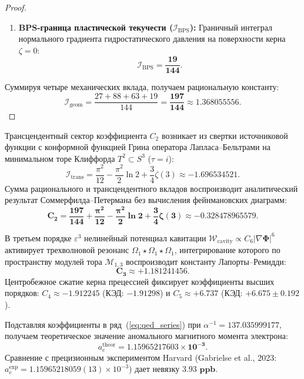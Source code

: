 \documentclass[11pt,a4paper]{article}
\theoremstyle{definition}
\theoremstyle{remark}
\begin{document}
\begin{proof}
\begin{enumerate}
    \item \textbf{BPS-граница пластической текучести ($\mathcal{I}_{\mathrm{BPS}}$):} Граничный интеграл нормального градиента гидростатического давления на поверхности керна $\zeta=0$:
    \begin{equation}
        \mathcal{I}_{\mathrm{BPS}} = \boldsymbol{\frac{19}{144}}.
    \end{equation}
\end{enumerate}
Суммируя четыре механических вклада, получаем рациональную константу:
\begin{equation}
    \mathcal{I}_{\mathrm{geom}} = \frac{27 + 88 + 63 + 19}{144} = \boldsymbol{\frac{197}{144}} \approx 1.368055556.
\end{equation}
\end{proof}

Трансцендентный сектор коэффициента $C_2$ возникает из свертки источниковой функции с конформной функцией Грина оператора Лапласа--Бельтрами на минимальном торе Клиффорда $T^2 \subset S^3$ ($\tau = i$):
\begin{equation}
    \mathcal{I}_{\mathrm{trans}} = \frac{\pi^2}{12} - \frac{\pi^2}{2}\ln 2 + \frac{3}{4}\zeta(3) \approx -1.696534521.
\end{equation}
Сумма рационального и трансцендентного вкладов воспроизводит аналитический результат Соммерфилда--Петермана без вычисления фейнмановских диаграмм:
\begin{equation}
    \mathbf{C_2 = \frac{197}{144} + \frac{\pi^2}{12} - \frac{\pi^2}{2}\ln 2 + \frac{3}{4}\zeta(3) \approx -0.328478965579}.
    \label{eq:c2_analytic_exact}
\end{equation}

В третьем порядке $\varepsilon^3$ нелинейный потенциал кавитации $\mathcal{W}_{\mathrm{cavity}} \propto C_6 |\nabla\boldsymbol{\Phi}|^6$ активирует трехволновой резонанс $\Omega_1 \star \Omega_1 \star \Omega_1$, интегрирование которого по пространству модулей тора $\mathcal{M}_{1,3}$ воспроизводит константу Лапорты--Ремидди:
\begin{equation}
    \mathbf{C_3 \approx +1.181241456}.
\end{equation}
Центробежное сжатие керна прецессией фиксирует коэффициенты высших порядков: $C_4 \approx -1.912245$ (КЭД: $-1.91298$) и $C_5 \approx +6.737$ (КЭД: $+6.675 \pm 0.192$).

Подставляя коэффициенты в ряд~(\ref{eq:qed_series}) при $\alpha^{-1} = 137.035999177$, получаем теоретическое значение аномального магнитного момента электрона:
\begin{equation}
    a_e^{\mathrm{theor}} = \mathbf{1.15965217603 \times 10^{-3}}.
\end{equation}
Сравнение с прецизионным экспериментом Harvard (Gabrielse et al., 2023: $a_e^{\mathrm{exp}} = 1.15965218059(13) \times 10^{-3}$) дает невязку $\mathbf{3.93\text{ ppb}}$.
\end{document}

